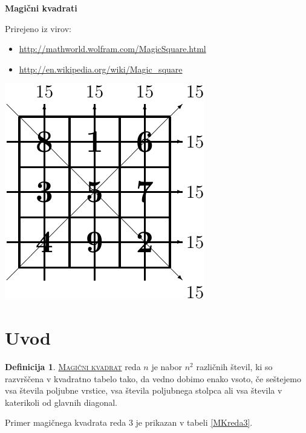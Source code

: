 \documentclass[a4paper,12pt]{article}
\newcommand{\pojem}[1]{\underline{\textsc{#1}}}
\theoremstyle{definition}
\newtheorem{definicija}{Definicija}
\theoremstyle{definition}
\begin{document}
\begin{center}
   \textbf{ \LARGE Magični kvadrati}
\end{center}


Prirejeno iz virov:
\begin{itemize}
   \item \url{http://mathworld.wolfram.com/MagicSquare.html}
   \item \url{http://en.wikipedia.org/wiki/Magic_square}
\end{itemize}

\begin{center}
   \includegraphics{slika.pdf}
\end{center}

\tableofcontents

\newpage


\section{Uvod}

\begin{definicija}
   \pojem{Magični kvadrat} reda $ n $  je nabor $ n^2 $ različnih števil,
   ki so razvrščena v kvadratno tabelo tako, da vedno dobimo enako vsoto,
   če seštejemo vsa števila poljubne vrstice, vsa števila poljubnega
   stolpca ali vsa števila v katerikoli od glavnih diagonal.
\end{definicija}

Primer magičnega kvadrata reda 3 je prikazan v tabeli \ref{MKreda3}.
\end{document}
